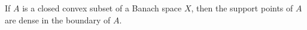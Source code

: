 If $A$ is a closed convex subset of a Banach space $X$, then the support points of $A$ are dense in the boundary of $A$.